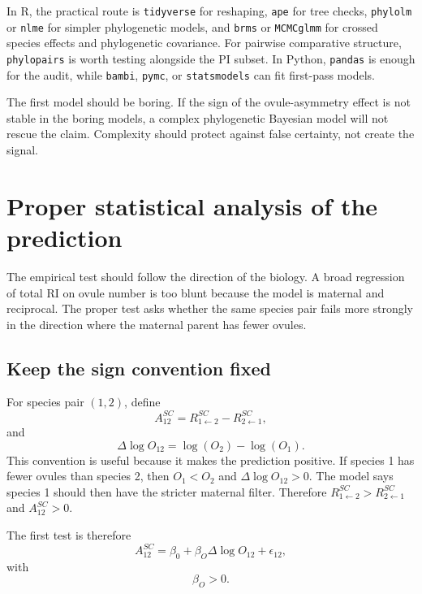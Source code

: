 \documentclass[12pt]{article}
\begin{document}
In R, the practical route is \texttt{tidyverse} for reshaping, \texttt{ape} for tree checks, \texttt{phylolm} or \texttt{nlme} for simpler phylogenetic models, and \texttt{brms} or \texttt{MCMCglmm} for crossed species effects and phylogenetic covariance. For pairwise comparative structure, \texttt{phylopairs} is worth testing alongside the PI subset. In Python, \texttt{pandas} is enough for the audit, while \texttt{bambi}, \texttt{pymc}, or \texttt{statsmodels} can fit first-pass models.

\begin{cautionbox}
The first model should be boring. If the sign of the ovule-asymmetry effect is not stable in the boring models, a complex phylogenetic Bayesian model will not rescue the claim. Complexity should protect against false certainty, not create the signal.
\end{cautionbox}

\section{Proper statistical analysis of the prediction}

The empirical test should follow the direction of the biology. A broad regression of total RI on ovule number is too blunt because the model is maternal and reciprocal. The proper test asks whether the same species pair fails more strongly in the direction where the maternal parent has fewer ovules.

\subsection{Keep the sign convention fixed}

For species pair $(1,2)$, define
\begin{equation}
A^{SC}_{12}=R^{SC}_{1\leftarrow 2}-R^{SC}_{2\leftarrow 1},
\label{eq:analysis-A-SC}
\end{equation}
and
\begin{equation}
\Delta\log O_{12}=\log(O_2)-\log(O_1).
\label{eq:analysis-dlogO}
\end{equation}
This convention is useful because it makes the prediction positive. If species 1 has fewer ovules than species 2, then $O_1<O_2$ and $\Delta\log O_{12}>0$. The model says species 1 should then have the stricter maternal filter. Therefore $R^{SC}_{1\leftarrow 2}>R^{SC}_{2\leftarrow 1}$ and $A^{SC}_{12}>0$.

The first test is therefore
\begin{equation}
A^{SC}_{12}=\beta_0+\beta_O\Delta\log O_{12}+\epsilon_{12},
\label{eq:first-plain-analysis}
\end{equation}
with
\begin{equation}
\boxed{\beta_O>0.}
\end{equation}
\end{document}
